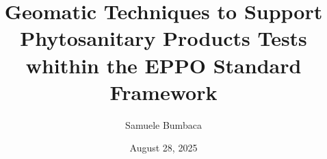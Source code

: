 \documentclass[aspectratio=43]{beamer}
\title{Geomatic Techniques to Support Phytosanitary Products Tests whithin the EPPO Standard Framework}
\author{Samuele Bumbaca}
\institute{University of Turin}
\date{August 28, 2025}
\begin{document}
\begin{frame}
    \titlepage
\end{frame}

%    
%        
%        
\end{document}
